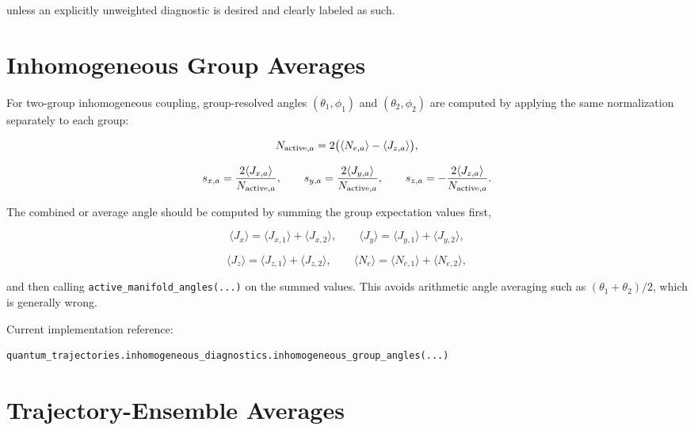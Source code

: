 \documentclass[11pt]{article}
\begin{document}
unless an explicitly unweighted diagnostic is desired and clearly labeled as
such.

\section*{Inhomogeneous Group Averages}

For two-group inhomogeneous coupling, group-resolved angles
\((\theta_1,\phi_1)\) and \((\theta_2,\phi_2)\) are computed by applying the same
normalization separately to each group:

\begin{equation}
N_{{\rm active},a}
=
2\bigl(\langle N_{e,a}\rangle-\langle J_{z,a}\rangle\bigr),
\end{equation}

\begin{equation}
s_{x,a}=\frac{2\langle J_{x,a}\rangle}{N_{{\rm active},a}},
\qquad
s_{y,a}=\frac{2\langle J_{y,a}\rangle}{N_{{\rm active},a}},
\qquad
s_{z,a}=-\frac{2\langle J_{z,a}\rangle}{N_{{\rm active},a}}.
\end{equation}

The combined or average angle should be computed by summing the group
expectation values first,

\begin{equation}
\langle J_x\rangle=\langle J_{x,1}\rangle+\langle J_{x,2}\rangle,
\qquad
\langle J_y\rangle=\langle J_{y,1}\rangle+\langle J_{y,2}\rangle,
\end{equation}

\begin{equation}
\langle J_z\rangle=\langle J_{z,1}\rangle+\langle J_{z,2}\rangle,
\qquad
\langle N_e\rangle=\langle N_{e,1}\rangle+\langle N_{e,2}\rangle,
\end{equation}

and then calling \texttt{active\_manifold\_angles(...)} on the summed values.
This avoids arithmetic angle averaging such as \((\theta_1+\theta_2)/2\), which
is generally wrong.

Current implementation reference:

\begin{verbatim}
quantum_trajectories.inhomogeneous_diagnostics.inhomogeneous_group_angles(...)
\end{verbatim}

\section*{Trajectory-Ensemble Averages}
\end{document}
